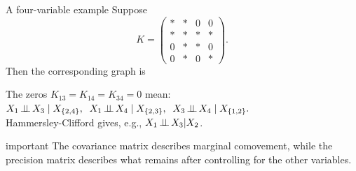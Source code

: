 \documentclass[dvipsnames,aspectratio=169,handout]{beamer}
\begin{document}
\begin{frame}{A four-variable example}
Suppose
{\small \[
K=
\begin{pmatrix}
* & * & 0 & 0\\
* & * & * & *\\
0 & * & * & 0\\
0 & * & 0 & *
\end{pmatrix}.
\]}
Then the corresponding graph is
\vspace{-5mm}
\begin{center}
\end{center}
\vspace{-5mm}
\begin{block}{}
The zeros $K_{13}=K_{14}=K_{34}=0$ mean:\;\;
$
X_1\indep X_3\mid X_{\{2,4\}},\;\;
X_1\indep X_4\mid X_{\{2,3\}},\;\;
X_3\indep X_4\mid X_{\{1,2\}}.
$\\[2mm]
Hammersley-Clifford gives, e.g., $X_1\mbox{\,$\perp\!\!\!\perp$\,} X_3|X_2$.
\end{block}
\begin{beamercolorbox}[wd=\textwidth,sep=7pt,center,rounded=true,shadow=true]{important}
The covariance matrix describes marginal comovement, while the precision matrix describes what remains after controlling for the other variables.
\end{beamercolorbox}
\end{frame}

%
\end{document}
